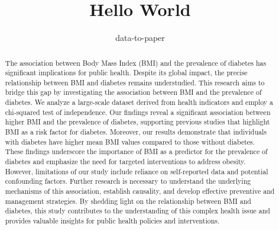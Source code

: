 \documentclass[12pt]{article}
\title{Hello World}
\author{data-to-paper}
\begin{document}
\maketitle

\begin{abstract}
The association between Body Mass Index (BMI) and the prevalence of diabetes has significant implications for public health. Despite its global impact, the precise relationship between BMI and diabetes remains understudied. This research aims to bridge this gap by investigating the association between BMI and the prevalence of diabetes. We analyze a large-scale dataset derived from health indicators and employ a chi-squared test of independence. Our findings reveal a significant association between higher BMI and the prevalence of diabetes, supporting previous studies that highlight BMI as a risk factor for diabetes. Moreover, our results demonstrate that individuals with diabetes have higher mean BMI values compared to those without diabetes. These findings underscore the importance of BMI as a predictor for the prevalence of diabetes and emphasize the need for targeted interventions to address obesity. However, limitations of our study include reliance on self-reported data and potential confounding factors. Further research is necessary to understand the underlying mechanisms of this association, establish causality, and develop effective preventive and management strategies. By shedding light on the relationship between BMI and diabetes, this study contributes to the understanding of this complex health issue and provides valuable insights for public health policies and interventions.
\end{abstract}
\end{document}

